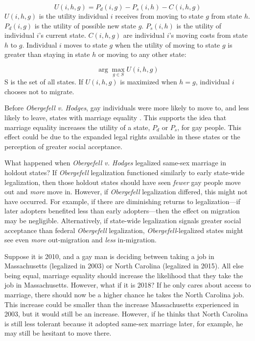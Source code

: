 \documentclass[12pt,letterpaper]{article}
\begin{document}
\begin{equation}
U(i, h, g) = P_d(i, g) - P_s(i, h) - C(i, h, g)
\end{equation}
$U(i, h, g)$ is the utility individual $i$ receives from moving to state $g$ from state $h$. $P_d(i, g)$ is the utility of possible new state $g$. $P_s(i, h)$ is the utility of individual $i$'s current state. $C(i, h, g)$ are individual $i$'s moving costs from state $h$ to $g$. Individual $i$ moves to state $g$ when the utility of moving to state $g$ is greater than staying in state $h$ or moving to any other state:

\begin{equation}
\arg\max_{g \in S} U(i, h, g)
\end{equation}
S is the set of all states. If $U(i, h, g)$ is maximized when $h = g$, individual $i$ chooses not to migrate.

\hfill
\break
Before \textit{Obergefell v. Hodges}, gay individuals were more likely to move to, and less likely to leave, states with marriage equality \citep{1, 12}. This supports the idea that marriage equality increases the utility of a state, $P_d$  or $P_s$, for gay people. This effect could be due to the expanded legal rights available in these states or the perception of greater social acceptance.

What happened when \textit{Obergefell v. Hodges} legalized same-sex marriage in holdout states? If \textit{Obergefell} legalization functioned similarly to early state-wide legalization, then those holdout states should have seen \textit{fewer} gay people move out and \textit{more} move in. However, if \textit{Obergefell} legalization differed, this might not have occurred. For example, if there are diminishing returns to legalization—if later adopters benefited less than early adopters—then the effect on migration may be negligible. Alternatively, if state-wide legalization signals greater social acceptance than federal \textit{Obergefell} legalization, \textit{Obergefell}-legalized states might see even \textit{more} out-migration and \textit{less} in-migration.

Suppose it is 2010, and a gay man is deciding between taking a job in Massachusetts (legalized in 2003) or North Carolina (legalized in 2015). All else being equal, marriage equality should increase the likelihood that they take the job in Massachusetts. However, what if it is 2018? If he only cares about access to marriage, there should now be a higher chance he takes the North Carolina job. This increase could be smaller than the increase Massachusetts experienced in 2003, but it would still be an increase. However, if he thinks that North Carolina is still less tolerant because it adopted same-sex marriage later, for example, he may still be hesitant to move there.
\end{document}
